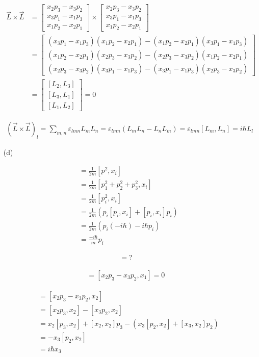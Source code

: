 \documentclass[11pt,a4paper]{article}
\begin{document}
\begin{enumerate}
\begin{align}
    \vec{L}\times\vec{L}&=
    \begin{bmatrix}
    x_2p_3-x_3p_2 \\
    x_3p_1-x_1p_3 \\
    x_1p_2-x_2p_1
    \end{bmatrix}
    \times
    \begin{bmatrix}
x_2p_3-x_3p_2 \\
x_3p_1-x_1p_3 \\
x_1p_2-x_2p_1
    \end{bmatrix}\\&=
    \begin{bmatrix}
    (x_3p_1-x_1p_3)(x_1p_2-x_2p_1)-(x_1p_2-x_2p_1)(x_3p_1-x_1p_3)\\
    (x_1p_2-x_2p_1)(x_2p_3-x_3p_2)-(x_2p_3-x_3p_2)(x_1p_2-x_2p_1)\\
    (x_2p_3-x_3p_2)(x_3p_1-x_1p_3)-(x_3p_1-x_1p_3)(x_2p_3-x_3p_2)
    \end{bmatrix}\\&=
    \begin{bmatrix}
    [L_2,L_3] \\
    [L_3,L_1] \\
    [L_1,L_2]
    \end{bmatrix}=0
\end{align}

\begin{align}
    (\vec{L}\times\vec{L})_l=\sum_{m,n}\varepsilon_{lmn}L_mL_n=\varepsilon_{lmn}(L_mL_n-L_nL_m)=\varepsilon_{lmn}[L_m,L_n]=i\hbar L_l
\end{align}

\item[(d)]

\begin{align}
    [\frac{p^2}{2m},x_i]&=\frac{1}{2m}[p^2,x_i]\\
    &=\frac{1}{2m}[p_1^2+p_2^2+p_3^2,x_i]\\
    &=\frac{1}{2m}[p_i^2,x_i]\\
    &=\frac{1}{2m}(p_i[p_i,x_i]+[p_i,x_i]p_i)\\
    &=\frac{1}{2m}(p_i(-i\hbar)-i\hbar p_i)\\
    &=\frac{-i\hbar}{m}p_i
\end{align}

\begin{align}
    [V(x),p_i]=?
\end{align}

\begin{align}
    [L_1,x_1]=[x_2p_3-x_3p_2,x_1]=0
\end{align}

\begin{align}
    [L_1,x_2]
    &=[x_2p_3-x_3p_2,x_2]\\
    &=[x_2p_3,x_2]-[x_3p_2,x_2]\\
    &=x_2[p_3,x_2]+[x_2,x_2]p_3-(x_3[p_2,x_2]+[x_3,x_2]p_2)\\
    &=-x_3[p_2,x_2]\\
    &=i\hbar x_3
\end{align}

\end{enumerate}
\end{document}
